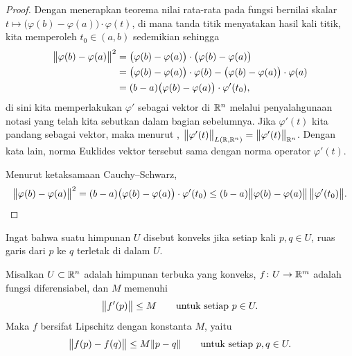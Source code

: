 \begin{proof}
Dengan menerapkan teorema nilai rata-rata pada fungsi bernilai skalar
$t \mapsto \bigl(\varphi(b)-\varphi(a) \bigr) \cdot \varphi(t)$,
di mana tanda titik menyatakan hasil kali titik, kita memperoleh
$t_0 \in (a,b)$ sedemikian sehingga
\begin{equation*}
\begin{split}
\bigl\lVert {\varphi(b)-\varphi(a)} \bigr\rVert^2
& =
\bigl( \varphi(b)-\varphi(a) \bigr)
\cdot
\bigl( \varphi(b)-\varphi(a) \bigr)
\\
& =
\bigl(\varphi(b)-\varphi(a) \bigr) \cdot \varphi(b) - 
\bigl(\varphi(b)-\varphi(a) \bigr) \cdot \varphi(a)
\\
& = 
(b-a)
\bigl(\varphi(b)-\varphi(a) \bigr) \cdot \varphi'(t_0) ,
\end{split}
\end{equation*}
di sini kita memperlakukan $\varphi'$ sebagai vektor di ${\mathbb{R}}^n$ melalui penyalahgunaan
notasi yang telah kita sebutkan dalam bagian sebelumnya.
Jika $\varphi'(t)$ kita pandang sebagai vektor, maka menurut
,
$\bigl\lVert {\varphi'(t)} \bigr\rVert_{L({\mathbb{R}},{\mathbb{R}}^n)} = \bigl\lVert {\varphi'(t)} \bigr\rVert_{{\mathbb{R}}^n}$.
Dengan kata lain, norma Euklides vektor tersebut sama dengan norma operator
$\varphi'(t)$.

Menurut ketaksamaan Cauchy--Schwarz,
\begin{equation*}
\bigl\lVert {\varphi(b)-\varphi(a)} \bigr\rVert^2
=
(b-a)\bigl(\varphi(b)-\varphi(a) \bigr) \cdot \varphi'(t_0)
\leq
(b-a)
\bigl\lVert {\varphi(b)-\varphi(a)} \bigr\rVert \, \bigl\lVert {\varphi'(t_0)} \bigr\rVert . \qedhere
\end{equation*}
\end{proof}

Ingat bahwa suatu himpunan $U$ disebut konveks
jika setiap kali $p,q \in U$, ruas garis dari
$p$ ke $q$ terletak di dalam $U$.

\begin{prop} \label{mv:prop:convexlip}
Misalkan $U \subset {\mathbb{R}}^n$ adalah himpunan terbuka yang konveks, $f \colon U \to {\mathbb{R}}^m$
adalah fungsi diferensiabel, dan $M$ memenuhi
\begin{equation*}
\bigl\lVert {f'(p)} \bigr\rVert \leq M
\qquad \text{untuk setiap } p \in U.
\end{equation*}
Maka $f$ bersifat Lipschitz dengan konstanta $M$, yaitu
\begin{equation*}
\bigl\lVert {f(p)-f(q)} \bigr\rVert \leq M \lVert {p-q} \rVert
\qquad
\text{untuk setiap } p,q \in U.
\end{equation*}
\end{prop}

